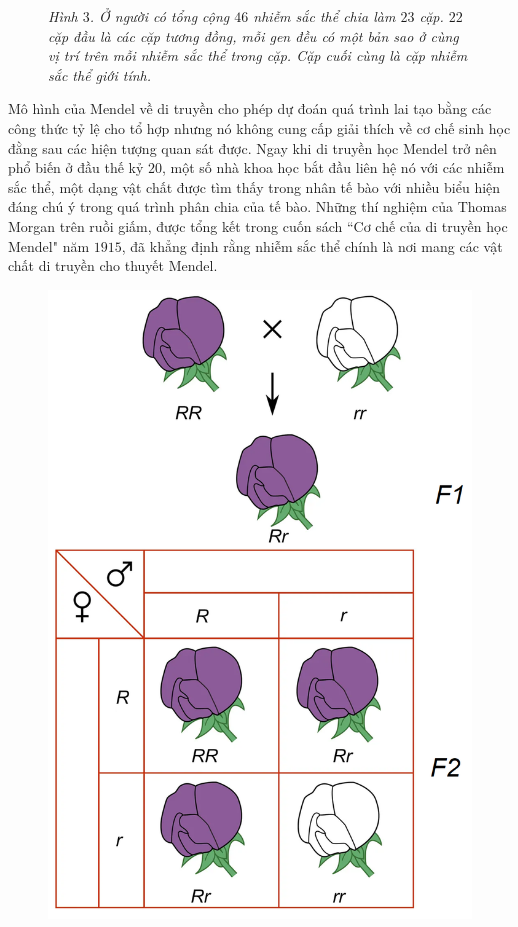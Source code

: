 \begin{multicols}{2}
\begin{figure}[H]
		\caption{\small\textit{\color{timhieukhoahoc}Hình $3$. Ở người có tổng cộng $46$ nhiễm sắc thể chia làm $23$ cặp. $22$ cặp đầu là các cặp tương đồng, mỗi gen đều có một bản sao ở cùng vị trí trên mỗi nhiễm sắc thể trong cặp. Cặp cuối cùng là cặp nhiễm sắc thể giới tính.}}
		\vspace*{-5pt}
	\end{figure}
	Mô hình của Mendel về di truyền cho phép dự đoán quá trình lai tạo bằng các công thức tỷ lệ cho tổ hợp nhưng nó không cung cấp giải thích về cơ chế sinh học đằng sau các hiện tượng quan sát được. Ngay khi di truyền học Mendel trở nên phổ biến ở đầu thế kỷ $20$, một số nhà khoa học bắt đầu liên hệ nó với các nhiễm sắc thể, một dạng vật chất được tìm thấy trong nhân tế bào với nhiều biểu hiện đáng chú ý trong quá trình phân chia của tế bào.
	\vskip 0.1cm
	Những thí nghiệm của Thomas Morgan trên ruồi giấm, được tổng kết trong cuốn sách ``Cơ chế của di truyền học Mendel" năm $1915$, đã khẳng định rằng nhiễm sắc thể chính là nơi mang các vật chất di truyền cho thuyết Mendel.
	\begin{figure}[H]
		\centering
		\vspace*{-10pt}
		\captionsetup{labelformat= empty, justification=centering}
		\includegraphics[width=0.85\linewidth]{image005}

\end{figure}
\end{multicols}
